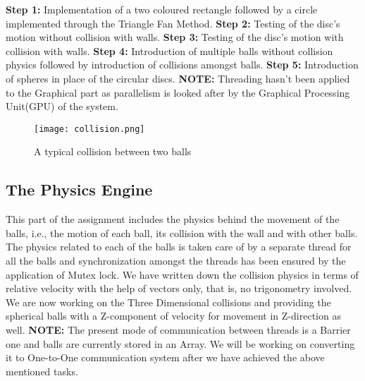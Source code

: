 \documentclass{report}
\begin{document}
\textbf{Step 1:} Implementation of a two coloured rectangle followed by a circle implemented through the Triangle Fan Method.
\linebreak
\linebreak
\textbf{Step 2:} Testing of the disc's motion without collision with walls.
\linebreak
\linebreak
\textbf{Step 3:} Testing of the disc's motion with collision with walls.
\linebreak
\linebreak
\textbf{Step 4:} Introduction of multiple balls without collision physics followed by introduction of 
collisions amongst balls.
\linebreak
\linebreak
\textbf{Step 5:} Introduction of spheres in place of the circular discs.
\linebreak
\linebreak
\textbf{NOTE:} Threading hasn't been applied to the Graphical part as parallelism is looked after by the Graphical Processing Unit(GPU) of the system.

\begin{figure}
    \centering
    \texttt{[image: collision.png]}
    \caption{A typical collision between two balls}
    \label{simulationfigure}
\end{figure}

\subsection{The Physics Engine}

This part of the assignment includes the physics behind the movement of the balls, i.e., the motion of each ball, its collision with the wall and with other balls. The physics related to each of the balls is taken care of by a separate thread for all the balls and synchronization amongst the threads has been ensured by the application of Mutex lock. We have written down the collision physics in terms of relative velocity with the help of vectors only, that is, no trigonometry involved. We are now working on the Three Dimensional collisions and providing the spherical balls with a Z-component of velocity for movement in Z-direction as well.
\linebreak
\linebreak
\textbf{NOTE: } The present mode of communication between threads is a Barrier one and balls are currently stored in an Array. We will be working on converting it to One-to-One communication system after we have achieved the above mentioned tasks.
\end{document}
